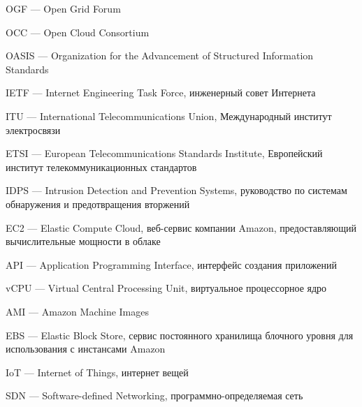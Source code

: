 \hypertarget{ogf}{OGF --- Open Grid Forum}

\hypertarget{occ}{OCC --- Open Cloud Consortium}

\clearpage

\hypertarget{oasis}{OASIS --- Organization for the Advancement of Structured Information Standards}

\hypertarget{ietf}{IETF --- Internet Engineering Task Force, инженерный совет Интернета}

\hypertarget{itu}{ITU --- International Telecommunications Union, Международный институт электросвязи}

\hypertarget{etsi}{ETSI --- European Telecommunications Standards Institute, Европейский институт телекоммуникационных стандартов}

\hypertarget{idps}{IDPS --- Intrusion Detection and Prevention Systems, руководство по системам обнаружения и предотвращения вторжений}

\hypertarget{ec2}{EC2 --- Elastic Compute Cloud, веб-сервис компании Amazon, предоставляющий вычислительные мощности в облаке}

\hypertarget{api}{API --- Application Programming Interface, интерфейс создания приложений}

\hypertarget{vcpu}{vCPU --- Virtual Central Processing Unit, виртуальное процессорное ядро}

\hypertarget{ami}{AMI --- Amazon Machine Images}

\hypertarget{ebs}{EBS --- Elastic Block Store, сервис постоянного хранилища блочного уровня для использования с инстансами Amazon}

\hypertarget{iot}{IoT --- Internet of Things, интернет вещей}

\hypertarget{sdn}{SDN --- Software-defined Networking, программно-определяемая сеть}

\clearpage
